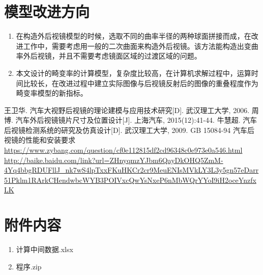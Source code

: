 \documentclass[withoutpreface,bwprint]{cumcmthesis} %
\begin{document}
\section{模型改进方向}
\begin{enumerate}
	\item 在构造外后视镜模型的时候，选取不同的曲率半径的两种球面拼接而成，在改进工作中，需要考虑用一般的二次曲面来构造外后视镜。该方法能构造出变曲率外后视镜，并且不需要考虑镜面区域的过渡区域的问题。
	\item 本文设计的畸变率的计算模型，复杂度比较高，在计算机求解过程中，运算时间比较长，在改进过程中建立实际图像与后视镜反射后的图像的重叠程度作为畸变率模型的新指标。
\end{enumerate}


\begin{thebibliography}{9}%
  王卫华. 汽车大视野后视镜的理论建模与应用技术研究[D]. 武汉理工大学, 2006.
  周博. 汽车外后视镜镜片尺寸及位置设计[J]. 上海汽车, 2015(12):41-44.
  牛慧超. 汽车后视镜检测系统的研究及仿真设计[D]. 武汉理工大学, 2009.
  GB 15084-94 汽车后视镜的性能和安装要求
 \url{https://www.zybang.com/question/cf0e112815df2cd96348c0e973e0a546.html}
  \url{http://baike.baidu.com/link?url=ZHnyqmzYJbm6QayDkOHQ5ZmM-4Yq4bbgRDUFllJ_nk7wS4lpTxxFKuHKCr2cr9MeuENIsMVkLY3L3y5gn57eDarr51Pklm1RArkCHendwbcWYB3POIVxcQwYsNxeP6nMbWQrYYoI9iH2oceYnzfxLK}
 
\end{thebibliography}

\newpage
\appendix

\section{附件内容}
\begin{enumerate}
	\item 计算中间数据.xlsx
	\item 程序.zip
\end{enumerate}
\end{document}
